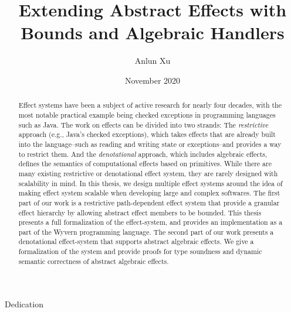 \documentclass[12pt]{cmuthesis}
\begin{document}
 
\frontmatter

\pagestyle{empty}

\title{ %
{\bf Extending Abstract Effects with Bounds and Algebraic Handlers}}
\author{Anlun Xu}
\date{November 2020}
\trnumber{}

\committee{
\ 
}

\support{}
\disclaimer{}



\maketitle

\begin{dedication}
Dedication
\end{dedication}

\pagestyle{plain} %


\begin{abstract}
Effect systems have been a subject of active research for nearly four decades, with the most notable practical example being checked exceptions in programming languages such as Java.  The work on effects can be divided into two strands: The \textit{restrictive} approach (e.g., Java's checked exceptions), which takes effects that are already built into the language--such as reading and writing state or exceptions--and provides a way to restrict them. And the \textit{denotational} approach, which includes algebraic effects, defines the semantics of computational effects based on primitives. While there are many existing restrictive or denotational effect system, they are rarely designed with scalability in mind. In this thesis, we design multiple effect systems around the idea of making effect system scalable when developing large and complex softwares. The first part of our work is a restrictive path-dependent effect system that provide a granular effect hierarchy by allowing abstract effect members to be bounded. This thesis presents a full formalization of the effect-system, and provides an implementation as a part of the Wyvern programming language. The second part of our work presents a denotational effect-system that supports abstract algebraic effects. We give a formalization of the system and provide proofs for type soundness and dynamic semantic correctness of abstract algebraic effects. 
\end{abstract}
\begin{acknowledgments}
\end{acknowledgments}
\end{document}

